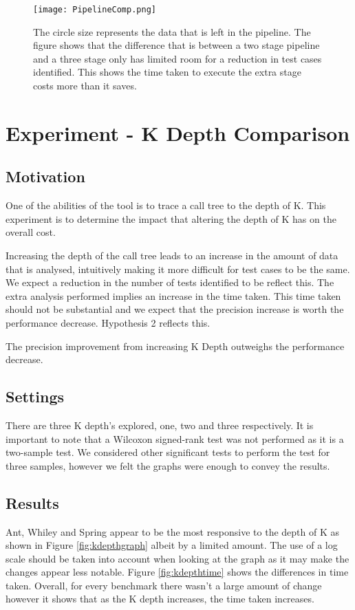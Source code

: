 \begin{figure}[h]
\centering
\texttt{[image: PipelineComp.png]}
\caption{The circle size represents the data that is left in the pipeline. The figure shows that the difference that is between a two stage pipeline and a three stage only has limited room for a reduction in test cases identified. This shows the time taken to execute the extra stage costs more than it saves.}
\label{fig:pipelinecomp}
\end{figure}

\section{Experiment  - K Depth Comparison}
\label{kdepthcomp}
\subsection{Motivation}
One of the abilities of the tool is to trace a call tree to the depth of K. This experiment is to determine the impact that altering the depth of K has on the overall cost. 

Increasing the depth of the call tree leads to an increase in the amount of data that is analysed, intuitively making it more difficult for test cases to be the same. We expect a reduction in the number of tests identified to be reflect this. The extra analysis performed implies an increase in the time taken. This time taken should not be substantial and we expect that the precision increase is worth the performance decrease. Hypothesis 2 reflects this.

\begin{hyp}
The precision improvement from increasing K Depth outweighs the performance decrease.
\end{hyp}

\subsection{Settings}
There are three K depth's explored, one, two and three respectively. It is important to note that a Wilcoxon signed-rank test was not performed as it is a two-sample test. We considered other significant tests to perform the test for three samples, however we felt the graphs were enough to convey the results.


\subsection{Results}
Ant, Whiley and Spring appear to be the most responsive to the depth of K as shown in Figure \ref{fig:kdepthgraph} albeit by a limited amount. The use of a log scale should be taken into account when looking at the graph as it may make the changes appear less notable. Figure \ref{fig:kdepthtime} shows the differences in time taken. Overall, for every benchmark there wasn't a large amount of change however it shows that as the K depth increases, the time taken increases. 

